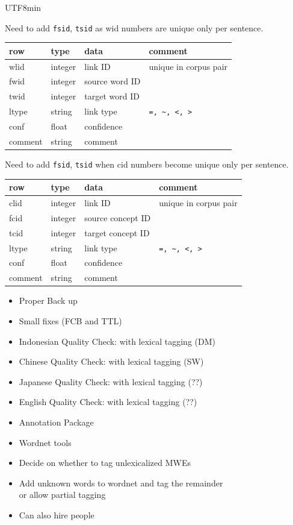 \documentclass[25pt,landscape,headrule,footrule,dvips]{foils}
\newcommand{\emp}[1]{\textcolor{red}{#1}}
\newcommand{\fd}[1]{\texttt{#1}}
\newcommand{\myslide}[1]{\foilhead[-25mm]{\raisebox{12mm}[0mm]{\emp{#1}}}}
\begin{document}
\begin{CJK}{UTF8}{min}
\myslide{WLINK Cross-Lingual Word Links}

Need to add \texttt{fsid}, \texttt{tsid} as wid numbers are unique only per sentence.

\noindent  \begin{tabular}{llll}
  \textbf{row}   &  \textbf{type} & \textbf{data} & \textbf{comment} \\\hline
  wlid & integer & link ID & unique in corpus pair \\
  fwid   & integer & source word ID & \\
  twid   & integer & target word ID & \\
  ltype  & string  & link type &  \verb|=, ~, <, >|\\
  conf   & float & confidence \\
  comment & string & comment \\
\hline
\end{tabular}

\myslide{CLINK Cross-Lingual Concept Information}

Need to add \fd{fsid}, \fd{tsid} when cid numbers become unique only per sentence.


\noindent  \begin{tabular}{llll}
  \textbf{row}   &  \textbf{type} & \textbf{data} & \textbf{comment} \\\hline
  clid & integer & link ID & unique in corpus pair \\
  fcid   & integer & source concept ID & \\
  tcid   & integer & target concept ID & \\
  ltype  & string  & link type &  \verb|=, ~, <, >|\\
  conf   & float & confidence \\
  comment & string & comment \\
\hline
\end{tabular}




\myslide{ToDo}

\begin{itemize}
\item Proper Back up
\item Small fixes (FCB and TTL)
\item Indonesian Quality Check: with lexical tagging (DM)
\item Chinese Quality Check: with lexical tagging (SW)
\item Japanese Quality Check: with lexical tagging (??)
\item English Quality Check: with lexical tagging (??)
\item Annotation Package
\item Wordnet tools
\item Decide on whether to tag unlexicalized MWEs
\item Add unknown words to wordnet and tag the remainder
\\ or allow partial tagging
\item Can also hire people
\end{itemize}




\end{CJK}
\clearpage
\end{document}
